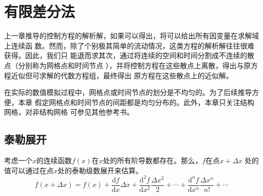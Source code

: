 \chapter{有限差分法}
上一章推导的控制方程的解析解，如果可以得出，将可以给出所有因变量在求解域上连续函
数。然而，除了个别极其简单的流动情况，这类方程的解析解往往很难获得。因此，我们只
能退而求其次，通过将连续的空间和时间分割成不连续的散点（分别称为网格点和时间节点
），并将控制方程在这些散点上离散，得出与原方程近似但可求解的代数方程组，最终得出
原方程在这些散点上的近似解。

在实际的数值模拟过程中，网格点或时间节点的划分是不均匀的。为了后续推导方便，本章
假定网格点和时间节点的间距都是均匀分布的。此外，本章只关注结构网格，对非结构网格
可参见其他参考书。

\section{泰勒展开}
考虑一个$x$的连续函数$f(x)$在$x$处的所有阶导数都存在。那么，$f$在点$x+\Delta x$
处的值可以通过在点$x$处的泰勒级数展开来估算。
\begin{equation}
  f(x+\Delta x)
  =
  f(x)
  +
  \frac{\mathrm{d} f}{\mathrm{d} x}\Delta x
  +
  \frac{\mathrm{d}^{2} f}{\mathrm{d} x^{2}}\frac{\Delta x^{2}}{2}
  +
  \cdots
  +
  \frac{\mathrm{d}^{n} f}{\mathrm{d} x^{n}}\frac{\Delta x^{n}}{n!}
  +
  \cdots
\end{equation}

